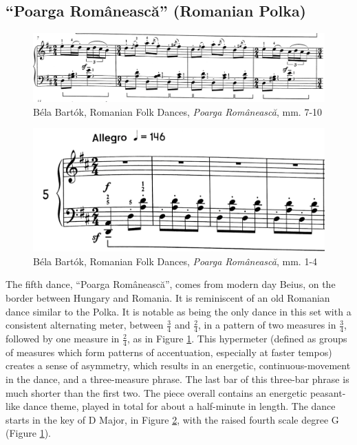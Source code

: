 \subsection{``Poarga Românească'' (Romanian Polka)}

\begin{figure}
  \centering
  \includegraphics[width=\textwidth]{figures/bartok-dance-five-time-signature.jpg}
  \caption{Béla Bartók, Romanian Folk Dances, \textit{Poarga Românească}, mm. 7-10}
  \label{fig:Bartók-dance-five-time-signature}
\end{figure}

\begin{figure}
  \centering
  \includegraphics[width=\textwidth]{figures/bartok-dance-five-first-four-bars.jpg}
  \caption{Béla Bartók, Romanian Folk Dances, \textit{Poarga Românească}, mm. 1-4}
  \label{fig:Bartók-dance-five-first-four-bars}
\end{figure}


The fifth dance, ``Poarga Românească'', comes from modern day Beius, on the border between Hungary and Romania. It is reminiscent of an old Romanian dance similar to the Polka. It is notable as being the only dance in this set with a consistent alternating meter, between $\frac{3}{4}$ and $\frac{2}{4}$, in a pattern of two measures in $\frac{3}{4}$, followed by one measure in $\frac{2}{4}$, as in Figure \ref{fig:Bartók-dance-five-time-signature}\autocite{Lung_2016}. This hypermeter (defined as groups of measures which form patterns of accentuation, especially at faster tempos\autocite{Hughes_Gotham_Hamm_2021}) creates a sense of asymmetry, which results in an energetic, continuous-movement in the dance, and a three-measure phrase. The last bar of this three-bar phrase is much shorter than the first two. The piece overall contains an energetic peasant-like dance theme, played in total for about a half-minute in length. The dance starts in the key of D Major, in Figure \ref{fig:Bartók-dance-five-first-four-bars}\autocite{Lung_2016}, with the raised fourth scale degree G\musSharp{} (Figure \ref{fig:Bartók-dance-five-time-signature}\autocite{Lung_2016}).

